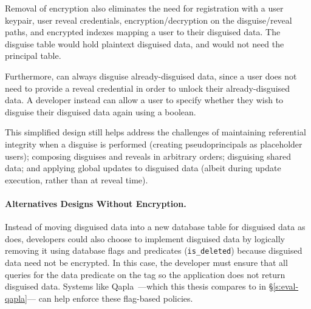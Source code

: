 %
Removal of encryption also eliminates the need for registration with a user
keypair, user reveal credentials, encryption/decryption on the disguise/reveal
paths, and encrypted indexes mapping a user to their disguised data. The
disguise table would hold plaintext disguised data, and \sys would not need the principal table.
%

%
Furthermore, \sys can always disguise already-disguised data, since a user does
not need to provide a reveal credential in order to unlock their
already-disguised data. A developer instead can allow a user to specify whether
they wish to disguise their disguised data again using a boolean.
%

This simplified design still helps address the challenges of maintaining
referential integrity when a disguise is performed (creating pseudoprincipals as
placeholder users); composing disguises and reveals in arbitrary orders;
disguising shared data; and applying global updates to disguised data (albeit
during update execution, rather than at reveal time).
%

%
\paragraph{Alternatives Designs Without Encryption.}
Instead of moving disguised data into a new database table for disguised data as
\sys does, developers could also choose to implement disguised data by logically
removing it using database flags and predicates (\eg \texttt{is\_deleted})
because disguised data need not be encrypted.
%
In this case, the developer must ensure that all queries for the data predicate
on the tag so the application does not return disguised data. Systems like
Qapla~\cite{qapla}---which this thesis compares to \sys in
\S\ref{s:eval-qapla}--- can help enforce these flag-based policies.
